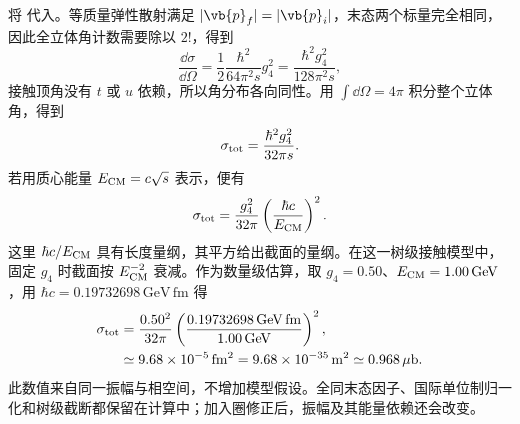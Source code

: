 \begin{exbox}
将 代入。等质量弹性散射满足 $|\vb{p}_f|=|\vb{p}_i|$，末态两个标量完全相同，因此全立体角计数需要除以 $2!$，得到
\begin{equation*}
 \frac{\dd\sigma}{\dd\Omega}
 =\frac12\frac{\hbar^2}{64\pi^2s}g_4^2
 =\frac{\hbar^2g_4^2}{128\pi^2s},
\end{equation*}
接触顶角没有 $t$ 或 $u$ 依赖，所以角分布各向同性。用 $\int\dd\Omega=4\pi$ 积分整个立体角，得到
\begin{equation}
 \sigma_{\rm tot}
 =\frac{\hbar^2g_4^2}{32\pi s}.
 \label{eq:phi4-total-cross-dp64}
\end{equation}
若用质心能量 $E_{\rm CM}=c\sqrt{s}$ 表示，便有
\begin{equation*}
 \sigma_{\rm tot}
 =\frac{g_4^2}{32\pi}
 \left(\frac{\hbar c}{E_{\rm CM}}\right)^2.
\end{equation*}
这里 $\hbar c/E_{\rm CM}$ 具有长度量纲，其平方给出截面的量纲。在这一树级接触模型中，固定 $g_4$ 时截面按 $E_{\rm CM}^{-2}$ 衰减。作为数量级估算，取 $g_4=0.50$、$E_{\rm CM}=1.00\,\mathrm{GeV}$，用 $\hbar c=0.19732698\,\mathrm{GeV\,fm}$ 得
\begin{align*}
 \sigma_{\rm tot}
 &=\frac{0.50^2}{32\pi}
 \left(\frac{0.19732698\,\mathrm{GeV\,fm}}{1.00\,\mathrm{GeV}}\right)^2,\\
 &\simeq9.68\times10^{-5}\,\mathrm{fm^2}
 =9.68\times10^{-35}\,\mathrm{m^2}
 \simeq0.968\,\mu\mathrm b.
\end{align*}
此数值来自同一振幅与相空间，不增加模型假设。全同末态因子、国际单位制归一化和树级截断都保留在计算中；加入圈修正后，振幅及其能量依赖还会改变。
\end{exbox}




